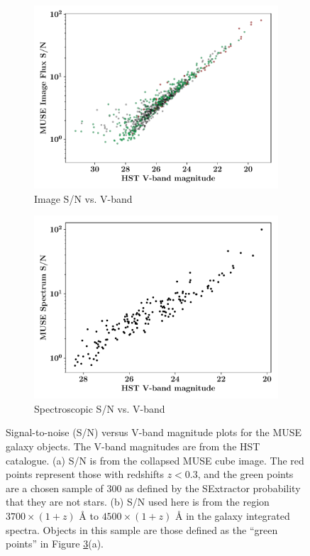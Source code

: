 \documentclass[12pt, twocolumn]{revtex4}    %
\begin{document}
\begin{figure}
  \begin{subfigure}[b]{0.495\textwidth}
    \includegraphics[width=\textwidth]{data/image_sn_vs_vband}
    \captionsetup{justification=justified}
    \caption{Image S/N vs. V-band}
    \label{fig:image_sn_vband}
  \end{subfigure}
  \begin{subfigure}[b]{0.495\textwidth}
    \includegraphics[width=\textwidth]{data/sn_vs_vband}
    \captionsetup{justification=justified}    
    \caption{Spectroscopic S/N vs. V-band}
    \label{fig:spec_sn_vband}
  \end{subfigure}
  \captionsetup{justification=justified}
  \caption[HUDF Objects]{Signal-to-noise (S/N) versus V-band magnitude plots for the MUSE galaxy objects. The V-band magnitudes are from the HST catalogue. (a) S/N is from the collapsed MUSE cube image. The red points represent those with redshifts $z<0.3$, and the green points are a chosen sample of 300 as defined by the SExtractor probability that they are not stars. (b) S/N used here is from the region $3700\times(1+z)$ {\AA} to $4500\times(1+z)$ {\AA} in the galaxy integrated spectra. Objects in this sample are those defined as the ``green points'' in Figure \ref{fig:sn_vband}(a).}
  \label{fig:sn_vband}
\end{figure}
\end{document}

